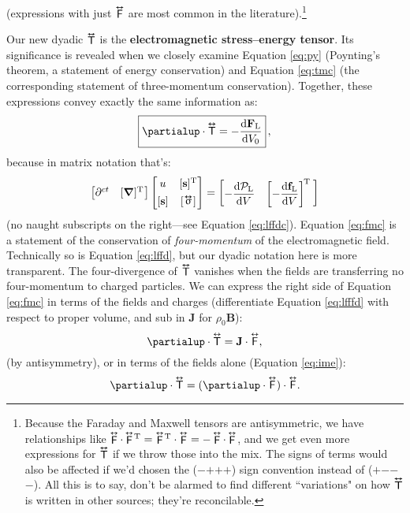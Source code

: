 \documentclass[12pt]{article}
\renewcommand{\vv}[1]{\mathbf{#1}}
\newcommand{\dd}[1]{\mathrm{d}#1}
\newcommand{\del}{\boldsymbol{\nabla}}
\newcommand{\tightoverset}[2]{%
  \mathop{#2}\limits^{\vbox to -.5ex{\kern-0.75ex\hbox{$#1$}\vss}}}
\newcommand{\inlinedy}[1]{\tightoverset{\text{\tiny$\bm\leftrightarrow$}}{#1}}
\newcommand{\fnoverset}[2]{%
  \mathop{#2}\limits^{\vbox to -.5ex{\kern-0.85ex\hbox{$#1$}\vss}}}
\newcommand{\footnotedy}[1]{\fnoverset{\text{\tiny$\bm\leftrightarrow$}}{#1}}
\newcommand{\capdy}[1]{ \overset{ \text{\tiny$\bm\leftrightarrow$} }{\vphantom{\text{\small{A}}}\smash{#1}} }
\begin{document}
(expressions with just $\inlinedy{\mathsf{F}}$ are most common in the literature).\footnote{Because the Faraday and Maxwell tensors are antisymmetric, we have relationships like $\footnotedy{\mathsf{F}} \cdot \footnotedy{\mathsf{F}} \mkern-2mu^\mathrm{T} = \footnotedy{\mathsf{F}} \mkern-2mu^\mathrm{T} \cdot \footnotedy{\mathsf{F}} = - \footnotedy{\mathsf{F}} \cdot \footnotedy{\mathsf{F}}$, and we get even more expressions for $\footnotedy{\mathsf{T}}$ if we throw those into the mix. The signs of terms would also be affected if we'd chosen the ($-$$+$$+$$+$) sign convention instead of ($+$$-$$-$$-$). All this is to say, don't be alarmed to find different ``variations" on how $\footnotedy{\mathsf{T}}$ is written in other sources; they're reconcilable.}

Our new dyadic $\inlinedy{\mathsf{T}}$ is the \textbf{electromagnetic stress--energy tensor}. Its significance is revealed when we closely examine Equation \ref{eq:py} (Poynting's theorem, a statement of energy conservation) and Equation \ref{eq:tmc} (the corresponding statement of three-momentum conservation). Together, these expressions convey exactly the same information as:
\begin{equation}\label{eq:fmc}
\boxed{ \partialup \cdot \capdy{\mathsf{T}} = - \dfrac{\dd \vv F_{\mathrm{L}}}{\dd V_0} } \, ,
\end{equation}
because in matrix notation that's:
\begin{equation}\label{eq:fmcm}
\begin{bmatrix}
\partial^{ct} & [ \del ]^{\mathrm{T}} \mkern1mu
\end{bmatrix}
\begin{bmatrix}
u & [\vv s]^{\mathrm{T}} \\[1ex]
[\vv s] & [ \, \mkern-2mu \inlinedy{\upsigma} \mkern1mu ]
\end{bmatrix}
=
\begin{bmatrix}
- \dfrac{\dd \mathcal{P}_{\textrm{L}}}{\dd V} & \left[ - \dfrac{\dd \vv f_{\mathrm{L}}}{\dd V} \right] ^{\mkern-2mu \mathrm{T} \; }
\end{bmatrix}
\end{equation}
(no naught subscripts on the right---see Equation \ref{eq:lffdc}). Equation \ref{eq:fmc} is a statement of the conservation of \emph{four-momentum} of the electromagnetic field. Technically so is Equation \ref{eq:lffd}, but our dyadic notation here is more transparent. The four-divergence of $\inlinedy{\mathsf{T}}$ vanishes when the fields are transferring no four-momentum to charged particles. We can express the right side of Equation \ref{eq:fmc} in terms of the fields and charges (differentiate Equation \ref{eq:lfffd} with respect to proper volume, and sub in $\vv J$ for $\rho_0 \vv B$):
\begin{equation*}
\partialup \cdot \capdy{\mathsf{T}} = \vv J \cdot \capdy{\mathsf{F}} ,
\end{equation*}
(by antisymmetry), or in terms of the fields alone (Equation \ref{eq:ime}):
\begin{equation*}
\partialup \cdot \capdy{\mathsf{T}} = ( \partialup \cdot \capdy{\mathsf{F}} ) \cdot \capdy{\mathsf{F}} .
\end{equation*}
\end{document}
